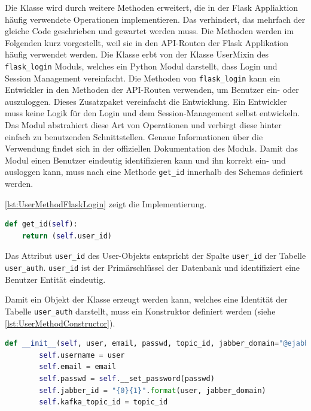 \documentclass[a4paper,titlepage,halfparskip,12pt]{scrreprt}
\begin{document}
\begin{onehalfspacing}
Die Klasse wird durch weitere Methoden erweitert, die in der Flask Appliaktion häufig verwendete Operationen implementieren. Das verhindert, das mehrfach der gleiche Code geschrieben und gewartet werden muss. Die Methoden werden im Folgenden kurz vorgestellt, weil sie in den \acs{API}-Routen der Flask Applikation häufig verwendet werden. Die Klasse erbt von der Klasse UserMixin des \texttt{flask\_login} Moduls, welches ein Python Modul darstellt, dass Login und Session Management vereinfacht. Die Methoden von \texttt{flask\_login} kann ein Entwickler in den Methoden der \acs{API}-Routen verwenden, um Benutzer ein- oder auszuloggen. Dieses Zusatzpaket vereinfacht die Entwicklung. Ein Entwickler muss keine Logik für den Login und dem Session-Management selbst entwickeln. Das Modul abstrahiert diese Art von Operationen und verbirgt diese hinter einfach zu benutzenden Schnittstellen. Genaue Informationen über die Verwendung findet sich in der offiziellen Dokumentation \cite{flaskLogin} des Moduls. Damit das Modul einen Benutzer eindeutig identifizieren kann und ihn korrekt ein- und ausloggen kann, muss nach \cite{flaskLogin} eine Methode \texttt{get\_id} innerhalb des Schemas definiert werden.

\autoref{lst:UserMethodFlaskLogin} zeigt die Implementierung.

\bigskip

\begin{lstlisting}[language=python, caption={Methode zur Identifizerung des Benutzers für das flask\_login Modul}, label={lst:UserMethodFlaskLogin}]
def get_id(self):
    return (self.user_id)
\end{lstlisting}

Das Attribut \texttt{user\_id} des User-Objekts entspricht der Spalte \texttt{user\_id} der Tabelle \texttt{user\_auth}. \texttt{user\_id} ist der Primärschlüssel der Datenbank und identifiziert eine Benutzer Entität eindeutig.

Damit ein Objekt der Klasse erzeugt werden kann, welches eine Identität der Tabelle \texttt{user\_auth} darstellt, muss ein Konstruktor definiert werden (siehe \autoref{lst:UserMethodConstructor}).

\bigskip

\begin{lstlisting}[language=python, caption={Konstruktor der Klasse User}, label={lst:UserMethodConstructor}]
    def __init__(self, user, email, passwd, topic_id, jabber_domain="@ejabberd-server"):
        self.username = user
        self.email = email
        self.passwd = self.__set_password(passwd)
        self.jabber_id = "{0}{1}".format(user, jabber_domain)
        self.kafka_topic_id = topic_id
\end{lstlisting}


\end{onehalfspacing}
\end{document}
